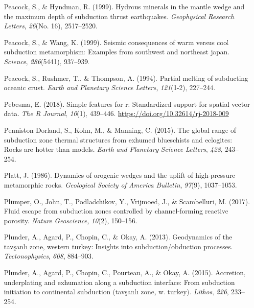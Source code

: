 \begin{CSLReferences}{1}{1}
\leavevmode{}%
Peacock, S., \& Hyndman, R. (1999). Hydrous minerals in the mantle wedge and the maximum depth of subduction thrust earthquakes. \emph{Geophysical Research Letters}, \emph{26}(No. 16), 2517--2520.

\leavevmode{}%
Peacock, S., \& Wang, K. (1999). Seismic consequences of warm versus cool subduction metamorphism: Examples from southwest and northeast japan. \emph{Science}, \emph{286}(5441), 937--939.

\leavevmode{}%
Peacock, S., Rushmer, T., \& Thompson, A. (1994). Partial melting of subducting oceanic crust. \emph{Earth and Planetary Science Letters}, \emph{121}(1-2), 227--244.

\leavevmode{}%
Pebesma, E. (2018). Simple features for r: Standardized support for spatial vector data. \emph{The R Journal}, \emph{10}(1), 439--446. \url{https://doi.org/10.32614/rj-2018-009}

\leavevmode{}%
Penniston-Dorland, S., Kohn, M., \& Manning, C. (2015). The global range of subduction zone thermal structures from exhumed blueschists and eclogites: Rocks are hotter than models. \emph{Earth and Planetary Science Letters}, \emph{428}, 243--254.

\leavevmode{}%
Platt, J. (1986). Dynamics of orogenic wedges and the uplift of high-pressure metamorphic rocks. \emph{Geological Society of America Bulletin}, \emph{97}(9), 1037--1053.

\leavevmode{}%
Plümper, O., John, T., Podladchikov, Y., Vrijmoed, J., \& Scambelluri, M. (2017). Fluid escape from subduction zones controlled by channel-forming reactive porosity. \emph{Nature Geoscience}, \emph{10}(2), 150--156.

\leavevmode{}%
Plunder, A., Agard, P., Chopin, C., \& Okay, A. (2013). Geodynamics of the tav{ş}anl{ı} zone, western turkey: Insights into subduction/obduction processes. \emph{Tectonophysics}, \emph{608}, 884--903.

\leavevmode{}%
Plunder, A., Agard, P., Chopin, C., Pourteau, A., \& Okay, A. (2015). Accretion, underplating and exhumation along a subduction interface: From subduction initiation to continental subduction (tav{ş}anl{ı} zone, w. turkey). \emph{Lithos}, \emph{226}, 233--254.


\end{CSLReferences}
